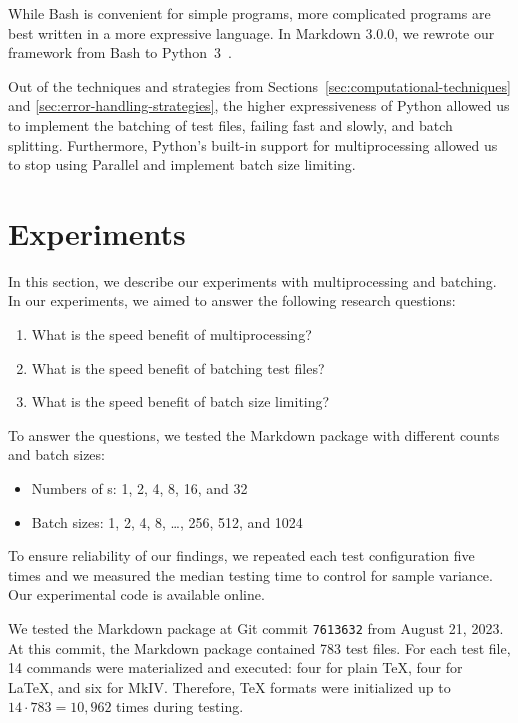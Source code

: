 \documentclass[final]{ltugboat}
\begin{document}
While Bash is convenient for simple programs, more complicated programs are best written in a more expressive language. In Markdown 3.0.0, we rewrote our framework from Bash to Python~3~\cite{novotny2023implement}.

Out of the techniques and strategies from Sections~\ref{sec:computational-techniques} and \ref{sec:error-handling-strategies}, the higher expressiveness of Python allowed us to implement the batching of test files, failing fast and slowly, and batch splitting. Furthermore, Python's built-in support for multiprocessing allowed us to stop using  Parallel and implement batch size limiting.

\section{Experiments}
\label{sec:experiments}

In this section, we describe our experiments with multiprocessing and batching. In our experiments, we aimed to answer the following research questions:
\begin{enumerate}
\item What is the speed benefit of multiprocessing?
\item What is the speed benefit of batching test files?
\item What is the speed benefit of batch size limiting?
\end{enumerate}
To answer the questions, we tested the Markdown package with different  counts and batch sizes:
\begin{itemize}
\item Numbers of s: 1, 2, 4, 8, 16, and 32
\item Batch sizes: 1, 2, 4, 8, \ldots, 256, 512, and 1024
\end{itemize}
To ensure reliability of our findings, we repeated each test configuration five times and we measured the median testing time to control for sample variance. Our experimental code is available online.~\cite{starynovotny2023measure}

We tested the Markdown package at Git commit \texttt{7613632} from August 21, 2023. At this commit, the Markdown package contained 783 test files. For each test file, 14 commands were materialized and executed: four for plain \TeX, four for \LaTeX, and six for  MkIV. Therefore, \TeX{} formats were initialized up to $14\cdot 783 = 10{,}962$ times during testing.
\end{document}
